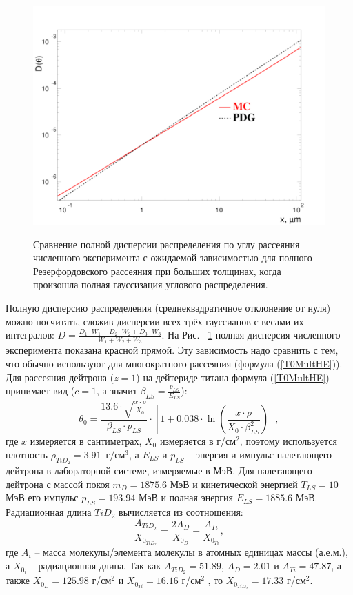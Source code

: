 \documentclass[a4paper,12pt]{article}
\begin{document}
\begin{large}
  \begin{figure}[ht]
    {
       \includegraphics[width=0.99\linewidth]{images/rms}
    }
    \caption{Сравнение полной дисперсии распределения по углу рассеяния численного эксперимента с ожидаемой зависимостью для полного Резерфордовского рассеяния при больших толщинах, когда произошла полная гауссизация углового распределения.}
    \label{fig:Check246}
  \end{figure}
  Полную дисперсию распределения (среднеквадратичное отклонение от нуля) можно посчитать, сложив дисперсии всех трёх гауссианов с весами их интегралов: $D=\frac{D_1\cdot W_1+D_2\cdot W_2+D_3\cdot W_3}{W_1+W_2+W_3}$.
  На Рис. ~\ref{fig:Check246} полная дисперсия численного эксперимента показана красной прямой.
  Эту зависимость надо сравнить с тем, что обычно используют для многократного рассеяния (формула (\ref{T0MultHE})).  
  Для рассеяния дейтрона ($z=1$) на дейтериде титана формула (\ref{T0MultHE}) принимает вид ($c=1$, а значит $\beta_{LS}=\frac{p_{LS}}{E_{LS}}$):
\begin{equation}
  \label{CheckTheta0Coefficient}
  \theta_0=\frac{13.6 \cdot \sqrt{\frac{x\cdot \rho}{X_0}}}{\beta_{LS}\cdot p_{LS}}\cdot\left[ 1+0.038\cdot\ln\left(\frac{x\cdot \rho}{X_0\cdot \beta^2_{LS}}\right)\right],
\end{equation}
где $x$ измеряется в сантиметрах, $X_0$ измеряется в г/см$^2$, поэтому используется плотность $\rho_{TiD_2}=3.91$~г/см$^3$, а $E_{LS}$ и $p_{LS}$ -- энергия и импульс налетающего дейтрона в лабораторной системе, измеряемые в МэВ. Для налетающего дейтрона с массой покоя $m_D=1875.6$ МэВ и кинетической энергией $T_{LS}=10$ МэВ его импульс $p_{LS}=193.94$ МэВ и полная энергия $E_{LS}=1885.6$ МэВ. Радиационная длина $TiD_2$ вычисляется из соотношения:
\begin{equation}
  \label{RadLength}
  \frac{A_{TiD_2}}{X_{0_{TiD_2}}}=\frac{2 A_{D}}{X_{0_{D}}}+\frac{A_{Ti}}{X_{0_{Ti}}},
\end{equation}
где $A_i$ -- масса молекулы/элемента молекулы в атомных единицах массы (а.е.м.), а $X_{0_i}$ -- радиационная длина.
  Так как $A_{TiD_2}=51.89$, $A_{D}=2.01$ и $A_{Ti}=47.87$, а также $X_{0_{D}}=125.98$ г/см$^2$ и $X_{0_{Ti}}=16.16$ г/см$^2$ \cite{PDG}, то $X_{0_{TiD_2}}=17.33$ г/см$^2$.


\end{large}
\end{document}
